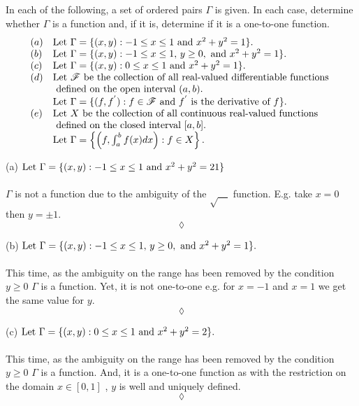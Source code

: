 \subsection{}
\begin{tcolorbox}
In each of the following, a set of ordered pairs $\Gamma$ is given. In each case, determine whether $\Gamma$ is a function and, if it is, determine if it is a one-to-one function.
\begin{align*}
\begin{array}{ll}
(a)&\text{Let } \Gamma=\{(x,y):-1\le x\le 1 \text{ and } x^2+y^2=1\}.  \\
(b)&\text{Let } \Gamma=\{(x,y):-1\le x\le 1,\, y \ge 0, \text{ and } x^2+y^2=1\}.  \\
(c)&\text{Let } \Gamma=\{(x,y):0\le x\le 1 \text{ and } x^2+y^2=1\}.  \\
(d)&\text{Let } \mathscr{F}\text{ be the collection of all real-valued differentiable functions }\\ 
&\text{ defined on the open interval } (a,b). \\
&\text{Let }\Gamma=\{(f,f^{'}):f\in\mathscr{F} \text{ and } f^{'} \text{ is the derivative of } f\}.  \\
(e)&\text{Let } X \text{ be the collection of all continuous real-valued functions }\\ 
&\text{ defined on the closed interval } [a,b]. \\
&\text{Let }\Gamma=\left\{\left ( f,\int_a^b f(x)dx\right):f\in X  \right \}.  \\
\end{array}
\end{align*} 
\end{tcolorbox}
(a) $\text{Let } \Gamma=\{(x,y):-1\le x\le 1 \text{ and } x^2+y^2=21\}$\\\\
$\Gamma$ is not a function due to the ambiguity of the $\sqrt{\quad}$ function. E.g. take $x=0$ then $y =\pm1$.
$$\lozenge$$

(b) $\text{Let } \Gamma=\{(x,y):-1\le x\le 1,\, y \ge 0, \text{ and } x^2+y^2=1\}. $ \\\\
This time, as the ambiguity on the range has been removed by the condition $y\ge0$ $\Gamma$ is a function. Yet, it is not one-to-one e.g. for $x=-1$ and $x=1$ we get the same value for $y$.
$$\lozenge$$

(c) $\text{Let } \Gamma=\{(x,y):0\le x\le 1 \text{ and } x^2+y^2=2\}. $ \\\\
This time, as the ambiguity on the range has been removed by the condition $y\ge0$ $\Gamma$ is a function. And,  it is a one-to-one function as with the restriction on the domain $x\in [0,1]$ , $y$ is well and uniquely defined.
$$\lozenge$$

